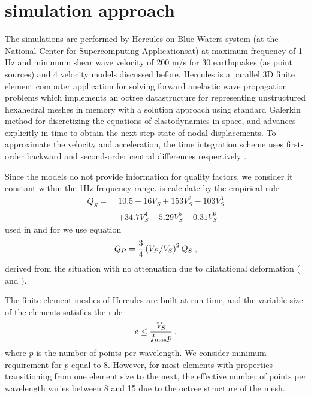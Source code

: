 
\section{simulation approach}

The simulations are performed by Hercules on Blue Waters system (at the National Center for Supercomputing Applicationsat) at maximum frequency of 1 Hz and minumum shear wave velocity of 200 m/s for 30 earthquakes (as point sources) and 4 velocity models discussed before. Hercules is a parallel 3D finite element computer application for solving forward anelastic wave propagation problems which implements an octree datastructure for representing unstructured hexahedral meshes in memory \citep{Tu_2006_Proc} with a solution approach using standard Galerkin method for discretizing the equations of elastodynamics in space, and advances explicitly in time to obtain the next-step state of nodal displacements. To approximate the velocity and acceleration, the time integration scheme uses first-order backward and second-order central differences respectively \citep{Taborda_2010_Tech}.

Since the models do not provide information for quality factors, we consider it constant within the 1Hz frequency range. \qs{} is calculate by the empirical rule
%
\begin{align}
	Q_S =\; 
		& 10.5 - 16 V_S + 153 V_S^2 - 103 V_S^3 
		\nonumber \\
		& + 34.7 V_S^4 - 5.29 V_S^5 + 0.31 V_S^6
	\label{eq:qs}
\end{align}
%
\noindent
used in \citet{Taborda_2013_BSSA, Taborda_2014_BSSA} and for \qp{} we use equation
%
\begin{equation}
	Q_P = \frac{3}{4}\left( V_P / V_S \right)^2 Q_S
	\hspace{.25em},
	\label{eq:qp}
\end{equation} 
% 
derived from the situation with no attenuation due to dilatational deformation (\citep{Stein_2003_Book} and \citep{Shearer_2009_Book}).


The finite element meshes of Hercules are built at run-time, and the variable size of the elements satisfies the rule
%
\begin{equation}
	e \leq \frac{V_S}{f_{\max} p}
	\hspace{.25em},
	\label{eq:esize}
\end{equation} 
% 
where $p$ is the number of points per wavelength. We consider minimum requirement for $p$ equal to  8. However, for most elements with properties transitioning from one element size to the next, the effective number of points per wavelength varies between 8 and 15 due to the octree structure of the mesh.
